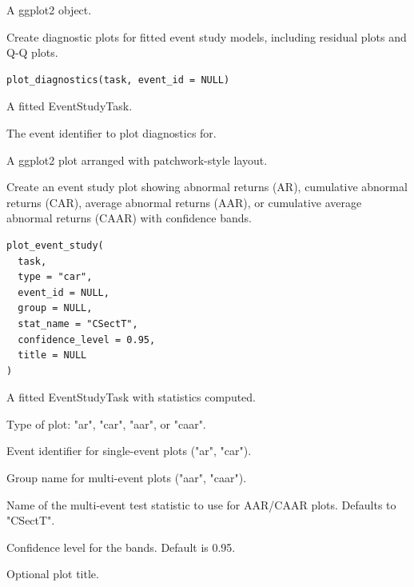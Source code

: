 \documentclass[a4paper]{book}
\begin{document}
%
\begin{Value}
A ggplot2 object.
\end{Value}
%
\begin{Description}
Create diagnostic plots for fitted event study models, including
residual plots and Q-Q plots.
\end{Description}
%
\begin{Usage}
\begin{verbatim}
plot_diagnostics(task, event_id = NULL)
\end{verbatim}
\end{Usage}
%
\begin{Arguments}
\begin{ldescription}
\item[\code{task}] A fitted EventStudyTask.

\item[\code{event\_id}] The event identifier to plot diagnostics for.
\end{ldescription}
\end{Arguments}
%
\begin{Value}
A ggplot2 plot arranged with patchwork-style layout.
\end{Value}
%
\begin{Description}
Create an event study plot showing abnormal returns (AR), cumulative
abnormal returns (CAR), average abnormal returns (AAR), or cumulative
average abnormal returns (CAAR) with confidence bands.
\end{Description}
%
\begin{Usage}
\begin{verbatim}
plot_event_study(
  task,
  type = "car",
  event_id = NULL,
  group = NULL,
  stat_name = "CSectT",
  confidence_level = 0.95,
  title = NULL
)
\end{verbatim}
\end{Usage}
%
\begin{Arguments}
\begin{ldescription}
\item[\code{task}] A fitted EventStudyTask with statistics computed.

\item[\code{type}] Type of plot: "ar", "car", "aar", or "caar".

\item[\code{event\_id}] Event identifier for single-event plots ("ar", "car").

\item[\code{group}] Group name for multi-event plots ("aar", "caar").

\item[\code{stat\_name}] Name of the multi-event test statistic to use
for AAR/CAAR plots. Defaults to "CSectT".

\item[\code{confidence\_level}] Confidence level for the bands. Default is 0.95.

\item[\code{title}] Optional plot title.
\end{ldescription}
\end{Arguments}
\end{document}
